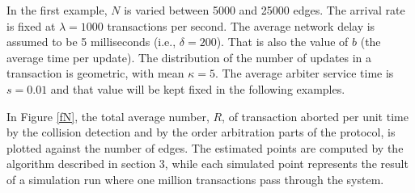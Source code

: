 \documentclass[runningheads]{llncs}
\begin{document}
In the first example, $N$ is varied between 5000 and 25000 edges. The arrival
rate is fixed at $\lambda =1000$ transactions per second. The average network
delay is assumed to be 5 milliseconds (i.e., $\delta = 200$). That is also the
value of $b$ (the average time per update). The distribution of the number of
updates in a transaction is geometric, with mean $\kappa =5$. The average
arbiter service time is $s=0.01$ and that value will be kept fixed in the
following examples.

In Figure \ref{fN}, the total average number, $R$, of transaction aborted per
unit time by the collision detection and by the order arbitration parts of the
protocol, is plotted against the number of edges. The estimated points are
computed by the algorithm described in section 3, while each simulated point
represents the result of a simulation run where one million transactions pass
through the system.
\end{document}
